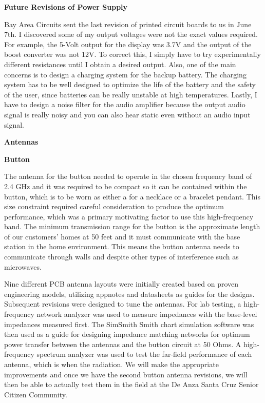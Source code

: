 \documentclass[journal,compsoc]{IEEEtran}
\begin{document}
\textbf {Future Revisions of Power Supply
}

Bay Area Circuits sent the last revision of printed circuit boards to us in June 7th. I discovered some of my output voltages were not the exact values required. For example, the 5-Volt output for the display was 3.7V and the output of the boost converter was not 12V. To correct this, I simply have to try experimentally different resistances until I obtain a desired output. Also, one of the main concerns is to design a charging system for the backup battery. The charging system has to be well designed to optimize the life of the battery and the safety of the user, since batteries can be really unstable at high temperatures. Lastly, I have to design a noise filter for the audio amplifier because the output audio signal is really noisy and you can also hear static even without an audio input signal. 


\textbf {Antennas}

\textbf {Button}

The antenna for the button needed to operate in the chosen frequency band of 2.4 GHz and it was required to be compact so it can be contained within the button, which is to be worn as either a for a necklace or a bracelet pendant.  This size constraint required careful consideration to produce the optimum performance, which was a primary motivating factor to use this high-frequency band.  The minimum transmission range for the button is the approximate length of our customers’ homes at 50 feet and it must communicate with the base station in the home environment.  This means the button antenna needs to communicate through walls and despite other types of interference such as microwaves.

Nine different PCB antenna layouts were initially created based on proven engineering models, utilizing appnotes and datasheets as guides for the designs.  Subsequent revisions were designed to tune the antennas.  For lab testing, a high-frequency network analyzer was used to measure impedances with the base-level impedances measured first. The SimSmith Smith chart simulation software was then used as a guide for designing impedance matching networks for optimum power transfer between the antennas and the button circuit at 50 Ohms.  A high-frequency spectrum analyzer was used to test the far-field performance of each antenna, which is when the radiation.  We will make the appropriate improvements and once we have the second button antenna revisions, we will then be able to actually test them in the field at the De Anza Santa Cruz Senior Citizen Community.
\end{document}
